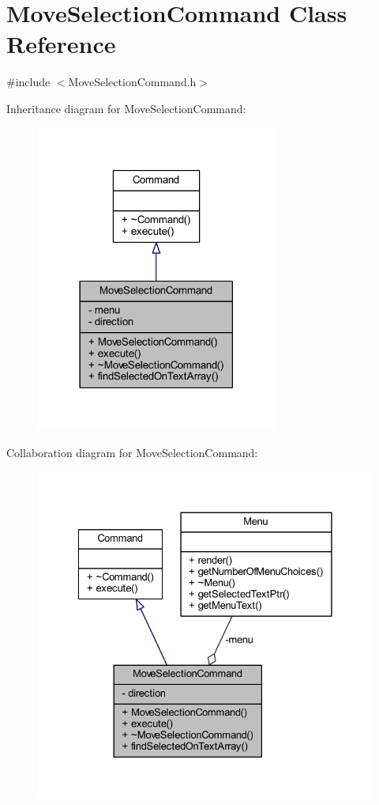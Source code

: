 \hypertarget{class_move_selection_command}{}\section{Move\+Selection\+Command Class Reference}
\label{class_move_selection_command}


{\ttfamily \#include $<$Move\+Selection\+Command.\+h$>$}



Inheritance diagram for Move\+Selection\+Command\+:\nopagebreak
\begin{figure}[H]
\begin{center}
\leavevmode
\includegraphics[width=225pt]{class_move_selection_command__inherit__graph}
\end{center}
\end{figure}


Collaboration diagram for Move\+Selection\+Command\+:\nopagebreak
\begin{figure}[H]
\begin{center}
\leavevmode
\includegraphics[width=328pt]{class_move_selection_command__coll__graph}
\end{center}
\end{figure}
